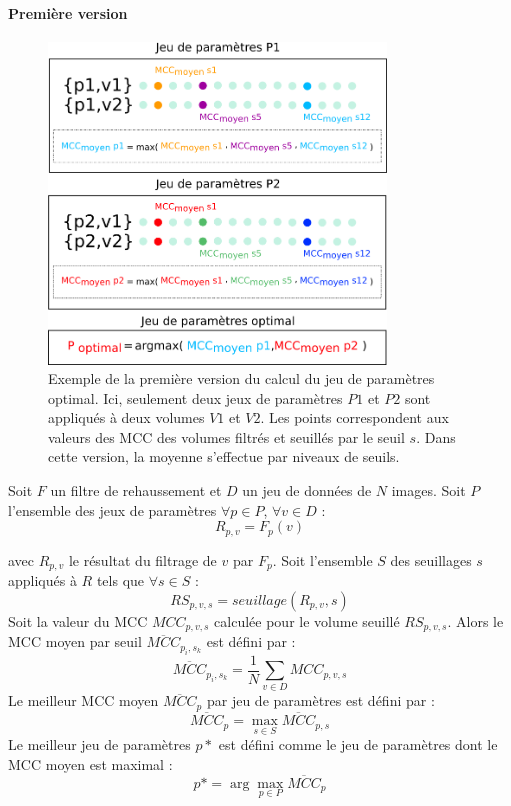   \paragraph{Première version}

  \begin{figure}[!ht]
    \centering
    \includegraphics[width=0.80\textwidth]{Images/optim_v1.png}
    \caption{Exemple de la première version du calcul du jeu de paramètres optimal. Ici, seulement deux jeux de paramètres $P1$ et $P2$ sont appliqués à deux volumes $V1$ et $V2$. Les points correspondent aux valeurs des MCC des volumes filtrés et seuillés par le seuil $s$. Dans cette version, la moyenne s'effectue par niveaux de seuils.}
    \label{fig:optim_v1}
  \end{figure}

  Soit $F$ un filtre de rehaussement et $D$ un jeu de données de $N$ images. Soit $P$ l'ensemble des jeux de paramètres
  $\forall p \in P$, $\forall v \in D$ :
  \begin{equation}
    R_{p,v} = F_{p}(v)
  \end{equation}

  avec $R_{p,v}$ le résultat du filtrage de $v$ par $F_p$.
  Soit l'ensemble $S$ des seuillages $s$ appliqués à $R$ tels que $\forall s \in S$ :
  \begin{equation}
    RS_{p,v,s} = seuillage(R_{p,v},s) 
  \end{equation}
  Soit la valeur du MCC $MCC_{p,v,s}$ calculée pour le volume seuillé $RS_{p,v,s}$.
  Alors le MCC moyen par seuil $\overline{MCC}_{p_i,s_k}$ est défini par :
  \begin{equation}
    \overline{MCC}_{p_i,s_k} = \frac{1}{N}\sum_{v \in D} MCC_{p,v,s}
  \end{equation}
  Le meilleur MCC moyen $\overline{MCC}_{p}$ par jeu de paramètres est défini par : 
  \begin{equation}
    \overline{MCC}_{p} = \max_{s \in S} \overline{MCC}_{p,s}
  \end{equation}
  Le meilleur jeu de paramètres $p*$ est défini comme le jeu de paramètres dont le MCC moyen est maximal :
  \begin{equation}
    p* = \arg\max_{p \in P} \overline{MCC}_{p}
  \end{equation}

